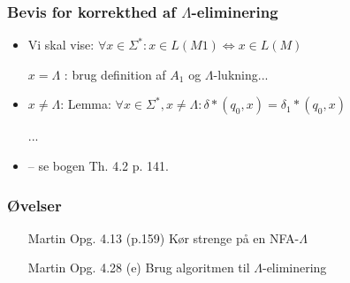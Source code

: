 \begin{frame}
\frametitle{Bevis for korrekthed af $\Lambda $-eliminering}
\begin{itemize}[<+->]
\item Vi skal vise:  $\forall x\in \Sigma^*: x \in L(M1) \Leftrightarrow x\in L(M)$
  
$x=\Lambda$ :
brug definition af $A_1$ og $\Lambda$-lukning...
\item
$x\neq \Lambda$:
Lemma:  $\forall x\in \Sigma^*, x\neq \Lambda :  \delta *(q_0, x) = \delta_1*(q_0, x)$

...

\item
– se bogen Th. 4.2 p. 141.
\end{itemize}
\end{frame}
\begin{frame}
\frametitle{Øvelser}
\begin{itemize}
\item [Martin] Opg. 4.13 (p.159)
Kør strenge på en NFA-$\Lambda$
\item [Martin] Opg. 4.28 (e)
Brug algoritmen til $\Lambda$-eliminering
\end{itemize}
\end{frame}

